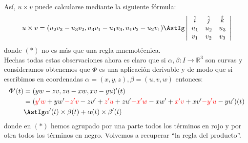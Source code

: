 \noindent
Así, $u\times v$ puede calcularse mediante la siguiente fórmula:
\begin{equation*}
    u\times v = (u_2v_3-u_3v_2,u_3v_1-u_1v_3,u_1v_2-u_2v_1) \AstIg \left|\begin{array}{ccc}
            \hat{i} & \hat{j} & \hat{k} \\
        u_1 & u_2 & u_3 \\
        v_1 & v_2 & v_3
    \end{array}\right|
\end{equation*}
donde $(\ast)$ no es más que una regla mnemotécnica.\\

\noindent
Hechas todas estas observaciones ahora es claro que si $\alpha,\beta:I\to\mathbb{R}^3$ son curvas y consideramos
obtenemos que $\Phi$ es una aplicación derivable y de modo que si escribimos en coordenadas $\alpha=(x,y,z),\beta=(u,v,w)$ entonces:
\begin{align*}
    \Phi'(t) &= (yw-zv, zu-xw, xv-yu)'(t) \\
             &= (\red{y'w} + yw' \red{- z'v} - zv' + \red{z'u} + zu' \red{- x'w} - xw' + \red{x'v} + xv' \red{- y'u} - yu')(t) \\
             &\AstIg \alpha'(t)\times \beta(t) + \alpha(t)\times\beta'(t)
\end{align*}
donde en $(\ast)$ hemos agrupado por una parte todos los términos en rojo y por otra todos los términos en negro. Volvemos a recuperar ``la regla del producto''.

